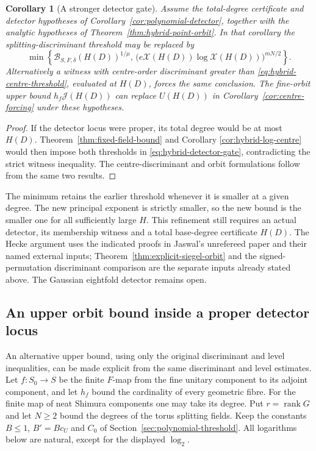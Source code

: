 \documentclass[11pt]{article}
\newtheorem{corollary}[theorem]{Corollary}
\theoremstyle{definition}
\theoremstyle{remark}
\begin{document}
\begin{corollary}[A stronger detector gate]
\label{cor:hybrid-detector}
Assume the total-degree certificate and detector hypotheses of
Corollary~\ref{cor:polynomial-detector}, together with the analytic
hypotheses of Theorem~\ref{thm:hybrid-point-orbit}.
In that corollary the splitting-discriminant threshold may be
replaced by
\begin{equation}\label{eq:hybrid-detector-gate}
 \min\left\{
 \mathcal B_{S,F,\delta}(H(D))^{1/\mu},\,
 \bigl(e\mathcal X(H(D))\log\mathcal X(H(D))\bigr)^{mN/2}
 \right\}.
\end{equation}
Alternatively a witness with centre-order discriminant greater
than \eqref{eq:hybrid-centre-threshold}, evaluated at $H(D)$,
forces the same conclusion.  The fine-orbit upper bound
$h_f\mathcal J(H(D))$ can replace $U(H(D))$ in
Corollary~\ref{cor:centre-forcing} under these hypotheses.
\end{corollary}

\begin{proof}
If the detector locus were proper, its total degree would be at
most $H(D)$.  Theorem~\ref{thm:fixed-field-bound} and Corollary
\ref{cor:hybrid-log-centre} would then impose both thresholds in
\eqref{eq:hybrid-detector-gate}, contradicting the strict witness
inequality.  The centre-discriminant and orbit formulations follow
from the same two results.
\end{proof}

The minimum retains the earlier threshold whenever it is smaller
at a given degree.  The new principal exponent is strictly smaller,
so the new bound is the smaller one for all sufficiently large
$H$.  This refinement still requires an actual detector, its
membership witness and a total base-degree certificate $H(D)$.
The Hecke argument uses the indicated proofs in Jaswal's
unrefereed paper and their named external inputs; Theorem~\ref{thm:explicit-siegel-orbit} and the
signed-permutation discriminant comparison are the separate inputs
already stated above.  The Gaussian eightfold detector remains open.

\subsection{An upper orbit bound inside a proper detector locus}
\label{subsec:orbit-upper}

An alternative upper bound, using only the original discriminant and
level inequalities, can be made explicit from the same
discriminant and level estimates.  Let $f:S_0\to S$ be the finite
$F$-map from the fine unitary component to its adjoint component,
and let $h_f$ bound the cardinality of every geometric fibre.
For the finite map of neat Shimura components one may take its
degree.  Put $r=\operatorname{rank}G$ and let $N\geq2$ bound the
degrees of the torus splitting fields.  Keep the constants
$B\leq1$, $B'=Bc_U$ and $C_0$ of
Section~\ref{sec:polynomial-threshold}.  All logarithms below
are natural, except for the displayed $\log_2$.
\end{document}
